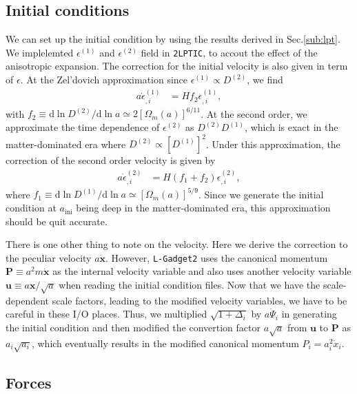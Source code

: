 \documentclass[a4paper,11pt]{article}
\renewcommand{\d}{\mathrm{d}}
\newcommand{\vx}{{\bm x}}
\newcommand{\vu}{{\bm u}}
\newcommand{\vP}{{\bm P}}
\begin{document}
\subsection{Initial conditions}
\label{sub:ics}

We can set up the initial condition by using the results derived in Sec.\ref{sub:lpt}.
We implelemted $\epsilon^{(1)}$ and $\epsilon^{(2)}$ field in \texttt{2LPTIC},
to accout the effect of the anisotropic expansion.
The correction for the initial velocity is also given in term of $\epsilon$.
At the Zel'dovich approximation since $\epsilon^{(1)}\propto D^{(2)}$, we find
\begin{align}
    a\dot\epsilon^{(1)}_{,i} &=  H f_2 \epsilon^{(1)}_{,i},
    \label{eq:vel_ZA}
\end{align}
with $f_2\equiv \d \ln D^{(2)}/\d \ln a \simeq 2[\Omega_m(a)]^{6/11}$.
At the second order, we approximate the time dependence of $\epsilon^{(2)}$ as $D^{(2)}D^{(1)}$, 
which is exact in the matter-dominated era where $D^{(2)}\propto [D^{(1)}]^2$.
Under this approximation, the correction of the second order velocity is given by
\begin{align}
    a\dot\epsilon^{(2)}_{,i} &=  H (f_1 + f_2 )\epsilon^{(2)}_{,i},
    \label{eq:vel_2LPT}
\end{align}
where $f_1\equiv \d \ln D^{(1)}/\d \ln a \simeq [\Omega_m(a)]^{5/9}$.
Since we generate the initial condition at $a_\mathrm{ini}$ being deep in the matter-dominated era,
this approximation should be quit accurate.

There is one other thing to note on the velocity. Here we derive the correction to the peculiar velocity $a\dot \vx$.
However, \texttt{L-Gadget2} uses the canonical momentum $\vP \equiv a^2m\dot \vx$ as the internal velocity  variable
and also uses another velocity variable $\vu \equiv a\vx/\sqrt{a}$ when reading the initial condition files.
Now that we have the scale-dependent scale factors, leading to the modified velocity variables, 
we have to be careful in these I/O places.
Thus, we multiplied $\sqrt{1+\Delta_i}$ by $a\dot\Psi_i$ in generating the initial condition and
then modified the convertion factor $a\sqrt{a}$ from $\vu$ to $\vP$ as $a_i\sqrt{a_i}$,
which eventually results in the modified canonical momentum $P_i=a_i^2\dot x_i$.

\subsection{Forces}
\label{sub:treepm}
\end{document}
